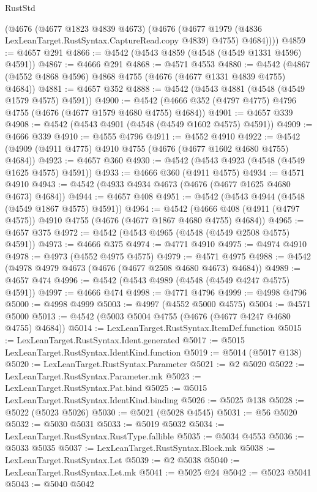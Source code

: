 \begin{lexlean}{RustStd}
\begin{coremodule}
        (@4676
          (@4677 @1823 @4839 @4673)
          (@4676
            (@4677 @1979 (@4836 LexLeanTarget.RustSyntax.CaptureRead.copy @4839) @4755)
            @4684))))
@4859 := @4657 @291
@4866 := @4542 (@4543 @4859 (@4548 (@4549 @1331 @4596) @4591))
@4867 := @4666 @291
@4868 := @4571 @4553
@4880 := @4542 (@4867 (@4552 @4868 @4596) @4868 @4755 (@4676 (@4677 @1331 @4839 @4755) @4684))
@4881 := @4657 @352
@4888 := @4542 (@4543 @4881 (@4548 (@4549 @1579 @4575) @4591))
@4900 := @4542 (@4666 @352 (@4797 @4775) @4796 @4755 (@4676 (@4677 @1579 @4680 @4755) @4684))
@4901 := @4657 @339
@4908 := @4542 (@4543 @4901 (@4548 (@4549 @1602 @4575) @4591))
@4909 := @4666 @339
@4910 := @4555 @4796
@4911 := @4552 @4910
@4922 := @4542 (@4909 (@4911 @4775) @4910 @4755 (@4676 (@4677 @1602 @4680 @4755) @4684))
@4923 := @4657 @360
@4930 := @4542 (@4543 @4923 (@4548 (@4549 @1625 @4575) @4591))
@4933 := @4666 @360 (@4911 @4575)
@4934 := @4571 @4910
@4943 := @4542 (@4933 @4934 @4673 (@4676 (@4677 @1625 @4680 @4673) @4684))
@4944 := @4657 @408
@4951 := @4542 (@4543 @4944 (@4548 (@4549 @1867 @4575) @4591))
@4964 := @4542
    (@4666 @408 (@4911 (@4797 @4575)) @4910 @4755 (@4676 (@4677 @1867 @4680 @4755) @4684))
@4965 := @4657 @375
@4972 := @4542 (@4543 @4965 (@4548 (@4549 @2508 @4575) @4591))
@4973 := @4666 @375
@4974 := @4771 @4910
@4975 := @4974 @4910
@4978 := @4973 (@4552 @4975 @4575)
@4979 := @4571 @4975
@4988 := @4542 (@4978 @4979 @4673 (@4676 (@4677 @2508 @4680 @4673) @4684))
@4989 := @4657 @474
@4996 := @4542 (@4543 @4989 (@4548 (@4549 @4247 @4575) @4591))
@4997 := @4666 @474
@4998 := @4771 @4796
@4999 := @4998 @4796
@5000 := @4998 @4999
@5003 := @4997 (@4552 @5000 @4575)
@5004 := @4571 @5000
@5013 := @4542 (@5003 @5004 @4755 (@4676 (@4677 @4247 @4680 @4755) @4684))
@5014 := LexLeanTarget.RustSyntax.ItemDef.function
@5015 := LexLeanTarget.RustSyntax.Ident.generated
@5017 := @5015 LexLeanTarget.RustSyntax.IdentKind.function
@5019 := @5014 (@5017 @138)
@5020 := LexLeanTarget.RustSyntax.Parameter
@5021 := @2 @5020
@5022 := LexLeanTarget.RustSyntax.Parameter.mk
@5023 := LexLeanTarget.RustSyntax.Pat.bind
@5025 := @5015 LexLeanTarget.RustSyntax.IdentKind.binding
@5026 := @5025 @138
@5028 := @5022 (@5023 @5026)
@5030 := @5021 (@5028 @4545)
@5031 := @56 @5020
@5032 := @5030 @5031
@5033 := @5019 @5032
@5034 := LexLeanTarget.RustSyntax.RustType.fallible
@5035 := @5034 @4553
@5036 := @5033 @5035
@5037 := LexLeanTarget.RustSyntax.Block.mk
@5038 := LexLeanTarget.RustSyntax.Let
@5039 := @2 @5038
@5040 := LexLeanTarget.RustSyntax.Let.mk
@5041 := @5025 @24
@5042 := @5023 @5041
@5043 := @5040 @5042

\end{coremodule}
\end{lexlean}
